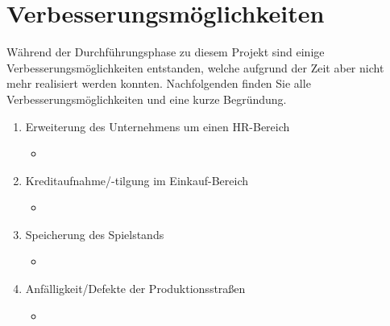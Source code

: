 \clearpage
\chapter{Verbesserungsmöglichkeiten}
Während der Durchführungsphase zu diesem Projekt sind einige Verbesserungsmöglichkeiten entstanden, welche aufgrund der Zeit aber nicht mehr realisiert werden konnten. Nachfolgenden finden Sie alle Verbesserungsmöglichkeiten und eine kurze Begründung.
\begin{enumerate}
	\item Erweiterung des Unternehmens um einen HR-Bereich
\begin{itemize}
	\item
\end{itemize} 
	\item Kreditaufnahme/-tilgung im Einkauf-Bereich
\begin{itemize}
	\item
\end{itemize} 
	\item Speicherung des Spielstands
\begin{itemize}
	\item
\end{itemize} 
	\item Anfälligkeit/Defekte der Produktionsstraßen
\begin{itemize}
	\item
\end{itemize} 	
\end{enumerate}




